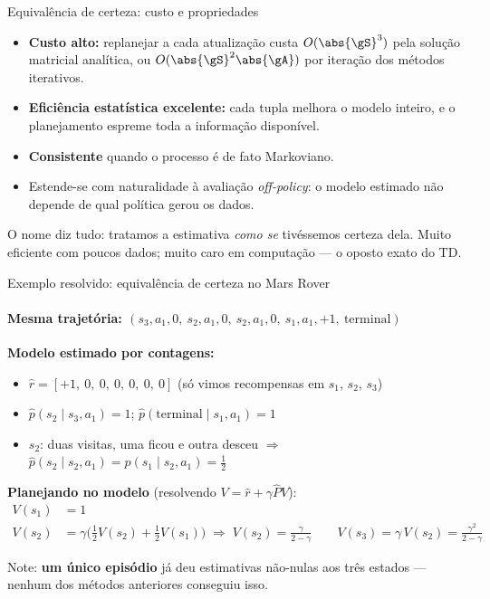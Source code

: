 \documentclass[aspectratio=169, 11pt]{beamer}
\begin{document}
\begin{frame}{Equivalência de certeza: custo e propriedades}
  \begin{itemize}
    \item \textbf{Custo alto:} replanejar a cada atualização custa
      $O(\abs{\gS}^3)$ pela solução matricial analítica, ou
      $O(\abs{\gS}^2 \abs{\gA})$ por iteração dos métodos iterativos.
    \item \textbf{Eficiência estatística excelente:} cada tupla melhora o
      modelo inteiro, e o planejamento espreme toda a informação disponível.
    \item \textbf{Consistente} quando o processo é de fato Markoviano.
    \item Estende-se com naturalidade à avaliação \emph{off-policy}:
      o modelo estimado não depende de qual política gerou os dados.
  \end{itemize}

  \begin{ideiabox}
    O nome diz tudo: tratamos a estimativa \emph{como se} tivéssemos
    certeza dela. Muito eficiente com poucos dados; muito caro em
    computação — o oposto exato do TD.
  \end{ideiabox}
\end{frame}

\begin{frame}{Exemplo resolvido: equivalência de certeza no Mars Rover}
  \framesubtitle{Mesma trajetória:
    $(s_3, a_1, 0,\ s_2, a_1, 0,\ s_2, a_1, 0,\ s_1, a_1, +1,\ \text{terminal})$}
  \textbf{Modelo estimado por contagens:}
  \begin{itemize}\setlength{\itemsep}{0.15ex}
    \item $\hat{r} = [+1,\ 0,\ 0,\ 0,\ 0,\ 0,\ 0]$
      (só vimos recompensas em $s_1$, $s_2$, $s_3$)
    \item $\hat{p}(s_2 \mid s_3, a_1) = 1$;\quad
      $\hat{p}(\text{terminal} \mid s_1, a_1) = 1$
    \item $s_2$: duas visitas, uma ficou e outra desceu $\Rightarrow$
      $\hat{p}(s_2 \mid s_2, a_1) = \hat{p}(s_1 \mid s_2, a_1) = \tfrac{1}{2}$
  \end{itemize}

  \textbf{Planejando no modelo} (resolvendo $V = \hat{r} + \gamma \hat{P} V$):
  \vspace{-0.4em}
  \begin{align*}
    V(s_1) &= 1\\
    V(s_2) &= \gamma\bigl(\tfrac12 V(s_2) + \tfrac12 V(s_1)\bigr)
      \;\Rightarrow\; V(s_2) = \tfrac{\gamma}{2 - \gamma}
    \qquad
    V(s_3) = \gamma\, V(s_2) = \tfrac{\gamma^2}{2-\gamma}
  \end{align*}
  \vspace{-1.2em}

  Note: \textbf{um único episódio} já deu estimativas não-nulas aos três
  estados — nenhum dos métodos anteriores conseguiu isso.
\end{frame}
\end{document}
